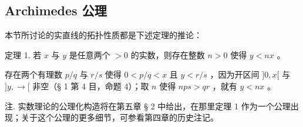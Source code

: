 \subsection{Archimedes 公理}

本节所讨论的实直线的拓扑性质都是下述定理的推论：

定理 1. 若 \(x\) 与 \(y\) 是任意两个 \(>0\) 的实数，则存在整数 \(n > 0\) 使得 \(y < nx\) 。

存在两个有理数 \(p / q\) 与 \(r / s\) 使得 \(0 < p / q < x\) 且 \(y < r / s\) ，因为开区间 \(]0, x[\) 与 \(]y, \rightarrow[\) 非空（§ 1 第 4 目，命题 4）；取 \(n\) 使得 \(nps > qr\) ，就有 \(y < nx\) 。

注. 实数理论的公理化构造将在第五章 § 2 中给出，在那里定理 1 作为一个公理出现；关于这个公理的更多细节，可参看第四章的历史注记。

